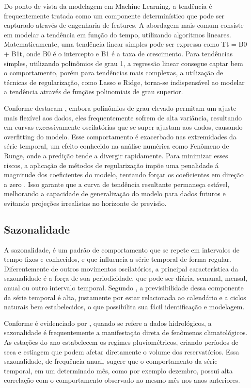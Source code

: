 Do ponto de vista da modelagem em Machine Learning, a tendência é frequentemente tratada como um componente determinístico que pode ser capturado através de engenharia de features. A abordagem mais comum consiste em modelar a tendência em função do tempo, utilizando algoritmos lineares. Matematicamente, uma tendência linear simples pode ser expressa como Tt = B0 + B1t, onde B0 é o intercepto e B1 é a taxa de crescimento. Para tendências simples, utilizando polinômios de grau 1, a regressão linear consegue captar bem o comportamento, porém para tendências mais complexas, a utilização de técnicas de regularização, como Lasso e Ridge, torna-se indispensável ao modelar a tendência através de funções polinomiais de grau superior. 

Conforme destacam \textcite{James}, embora polinômios de grau elevado permitam um ajuste mais flexível aos dados, eles frequentemente sofrem de alta variância, resultando em curvas excessivamente oscilatórias que se super ajustam aos dados, causando overfitting do modelo. Esse comportamento é exacerbado nas extremidades da série temporal, um efeito conhecido na análise numérica como Fenômeno de Runge, onde a predição tende a divergir rapidamente. Para minimizar esses riscos, a aplicação de métodos de regularização impõe uma penalidade á magnitude dos coeficientes do modelo, tentando forçar os coeficientes em direção a zero \cite{Hastie_Tibshirani_Friedman}. Isso garante que a curva de tendência resultante permaneça estável, melhorando a capacidade de generalização do modelo para dados futuros e evitando projeções irrealistas no horizonte de previsão. 

\subsection{Sazonalidade}

A sazonalidade, é um padrão de comportamento que se repete em intervalos de tempo fixos e conhecidos, e que influencia a série temporal de forma regular. Diferentemente de outros movimentos oscilatórios, a principal característica da sazonalidade é a força de sua periodicidade, que pode ser diária, semanal, mensal, anual ou outro intervalo temporal. Segundo \textcite{Hyndman_Athanassopoulos}, a previsibilidade dessa componente da série temporal é alta, justamente por estar relacionada ao calendário e a ciclos naturais bem estabelecidos, o que possibilita sua fácil identificação e modelagem.  

Conforme é evidenciado por \textcite{Morettin_Toloi}, quando se refere a dados hidrológicos, a sazonalidade é frequentemente a manifestação direta de fenômenos climatológicos. As estações do ano estabelecem os regimes pluviométricos, criando períodos de seca e estiagem que podem afetar diretamente o volume dos reservatórios. Essa sazonalidade, de frequência anual, sugere que o comportamento da série temporal, em um determinado mês, como por exemplo dezembro, possui alta correlação com o comportamento observado no mesmo mês nos anos anteriores.  

